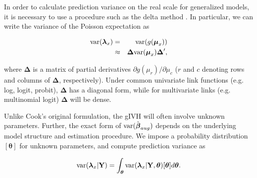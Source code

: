 \documentclass[12pt,fleqn]{article}
\begin{document}
\begin{flushleft}
In order to calculate prediction variance on the real scale for generalized models, it is necessary to use a procedure such as the delta method \citep{Dorfman1938}.  In particular, we can write the variance of the Poisson expectation as
\begin{linenomath*}
\begin{eqnarray}
  \label{eq:var-lambda}
  {\rm var}(\boldsymbol{\lambda}_x) & = & {\rm var}(g(\boldsymbol{\mu}_x)) \\
  & \approx & \boldsymbol{\Delta} {\rm var}(\boldsymbol{\mu}_x)\boldsymbol{\Delta}^\prime,
\end{eqnarray}
\end{linenomath*}
where $\boldsymbol{\Delta}$ is a matrix of partial derivatives $\partial g(\mu_r)/\partial \mu_c$ ($r$ and $c$ denoting rows and columns of $\boldsymbol{\Delta}$, respectively).  Under common univariate link functions (e.g. log, logit, probit), $\boldsymbol{\Delta}$ has a diagonal form, while for multivariate links (e.g. multinomial logit) $\boldsymbol{\Delta}$ will be dense.

\hspace{.5in} Unlike Cook's original formulation, the gIVH will often involve unknown parameters.  Further, the exact form of ${\rm var}(\hat{\boldsymbol{\beta}}_{aug})$ depends on the underlying model structure and estimation procedure.  We impose a probability distribution $[\boldsymbol{\theta}]$ for unknown parameters, and compute prediction variance as
\begin{linenomath*}
\begin{equation}
  \label{eq:E_var_lambda}
  {\rm var}(\boldsymbol{\lambda}_x | {\bf Y}) = \int_{\boldsymbol{\theta}} {\rm var}(\boldsymbol{\lambda}_x | {\bf Y}, \boldsymbol{\theta}) [\boldsymbol{\theta}] d \boldsymbol{\theta}.
\end{equation}
\end{linenomath*}


\end{flushleft}
\end{document}
